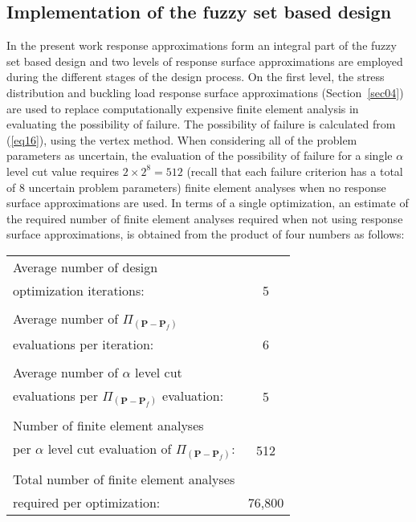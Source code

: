\documentclass[stropt]{svjour}
\def\p{\mathbf{P}}%
\begin{document}

\subsection{Implementation of the fuzzy set based design}
\label{sec05.03}

In the present work response approximations form an integral part of the fuzzy
set based design and two levels of response surface approximations are
employed during the different stages of the design process.
On the first level, the stress distribution and buckling load response
surface approximations (Section~\ref{sec04}) are used to replace
computationally expensive finite element analysis in evaluating the
possibility of failure.
The possibility of failure is calculated from (\ref{eq16}), using the vertex
method.
When considering all of the problem parameters as uncertain, the evaluation of
the possibility of failure for a single $\alpha$ level cut value requires
$2\times 2^8=512$ (recall that each failure criterion has a total of 8
uncertain problem parameters) finite element analyses when no response surface
approximations are used.
In terms of a single optimization, an estimate of the required number of
finite element analyses required when not using response surface
approximations, is obtained from the product of four numbers as follows:

\bigskip\noindent
\begin{tabular}{@{}lc@{}}
\tabcolsep5pt
Average number of design & \\
optimization iterations: & 5 \\
\\
Average number of $\Pi_{(\p-\p_f)}$ & \\
evaluations per iteration: & 6 \\
\\
Average number of $\alpha$ level cut & \\
evaluations per $\Pi_{(\p-\p_f)}$ evaluation: & 5 \\
\\
Number of finite element analyses & \\
per $\alpha$ level cut evaluation of $\Pi_{(\p-\p_f)}$: & 512 \\
\cline{2-2}
\\
Total number of finite element analyses & \\
required per optimization: & 76,800
\end{tabular}
\end{document}

